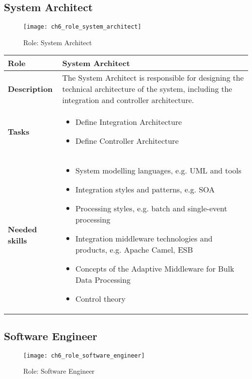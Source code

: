 \subsection{System Architect} 

\begin{figure}[htpb] \centering 
	\texttt{[image: ch6\_role\_system\_architect]} 
	\caption{Role: System Architect} 
	\label{fig:ch6_role_system_architect} 
\end{figure}

\begin{tabularx}{\textwidth}{@{} l X @{}}
	\caption{System Architect}\label{table:ch6_Role_System_Architect}\\
	\toprule 
	\bfseries Role & System Architect\\
	\midrule
	\bfseries Description & The System Architect is responsible for designing the technical architecture of the system, including the integration and controller architecture.\\
	\midrule
	\bfseries Tasks & 
	\begin{itemize}
		\item Define Integration Architecture
		\item Define Controller Architecture
	\end{itemize}
	\\
	\midrule
	\bfseries Needed skills & 
	\begin{itemize}
		\item System modelling languages, e.g. \ac{UML} and tools
		\item Integration styles and patterns, e.g. \ac{SOA}
		\item Processing styles, e.g. batch and single-event processing
		\item Integration middleware technologies and products, e.g. Apache Camel, \ac{ESB}
		\item Concepts of the Adaptive Middleware for Bulk Data Processing
		\item Control theory
	\end{itemize}
	\\
	\bottomrule
\end{tabularx}


\subsection{Software Engineer}

\begin{figure}[htpb] \centering 
	\texttt{[image: ch6\_role\_software\_engineer]} 
	\caption{Role: Software Engineer} 
	\label{fig:ch6_role_software_engineer} 
\end{figure}

